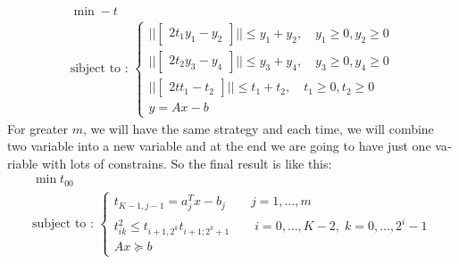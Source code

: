 \begin{latin}
\begin{enumerate}
	\begin{gather*}
		\min -t
		\\
		\text{sibject to : }
		\begin{cases}
			\Bigg|\Bigg|
			\begin{bmatrix}
				 2t_{1}
				 y_{1} - y_{2}
			\end{bmatrix} 
			\Bigg|\Bigg|
			\leq y_{1} + y_{2}, \quad y_{1} \geq 0, y_{2} \geq 0
			\\
			\Bigg|\Bigg|
			\begin{bmatrix}
				2t_{2}
				y_{3} - y_{4}
			\end{bmatrix} 
			\Bigg|\Bigg|
			\leq y_{3} + y_{4}, \quad y_{3} \geq 0, y_{4} \geq 0
			\\
			\Bigg|\Bigg|
			\begin{bmatrix}
				2t
				t_{1} - t_{2}
			\end{bmatrix} 
			\Bigg|\Bigg|
			\leq t_{1} + t_{2}, \quad t_{1} \geq 0, t_{2} \geq 0
			\\
			y = Ax - b
		\end{cases} 
	\end{gather*} 
	For greater $ m $, we will have the same strategy and each time, we will combine two variable into a new variable and at the end we are going to have just one variable with lots of constrains. So the final result is like this:
	\begin{gather*}
		\min t_{00}
		\\
		\text{subject to : } 
			\begin{cases}
			t_{K-1,j-1} = a^{T}_{j} x - b_{j} \qquad j = 1, \dots, m
			\\
			t_{ik}^{2} \leq t_{i+1,2^{k}}t_{i+1;2^{k}+1} \qquad i = 0, \dots, K - 2, \; k = 0, \dots, 2^{i}- 1
			\\
			Ax \succeq b
		\end{cases}
	\end{gather*}
\end{enumerate}	
\end{latin}